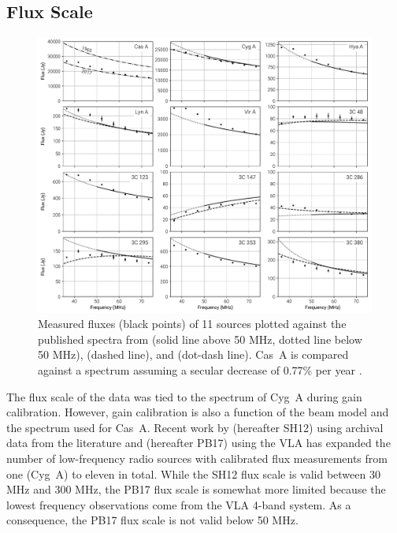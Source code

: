 \documentclass[twocolumn]{aastex61}
\begin{document}
\subsection{Flux Scale}

\begin{figure}[t]
    \includegraphics[width=\textwidth]{figures/flux-scale/flux-scale}
    \caption{
        Measured fluxes (black points) of 11 sources plotted against the published spectra from
        \citet{2017ApJS..230....7P} (solid line above 50 MHz, dotted line below 50 MHz),
        \citet{2012MNRAS.423L..30S} (dashed line), and \citet{1977A&A....61...99B} (dot-dash line).
        Cas~A is compared against a spectrum assuming a secular decrease of 0.77\% per year
        \citep{2009AJ....138..838H}.
    }
    \label{fig:flux-scale}
\end{figure}

The flux scale of the data was tied to the \citet{1977A&A....61...99B} spectrum of Cyg~A during gain
calibration. However, gain calibration is also a function of the beam model and the spectrum used
for Cas~A. Recent work by \citet{2012MNRAS.423L..30S} (hereafter SH12) using archival data from the
literature and \citet{2017ApJS..230....7P} (hereafter PB17) using the VLA has expanded the number of
low-frequency radio sources with calibrated flux measurements from one (Cyg~A) to eleven in total.
While the SH12 flux scale is valid between 30 MHz and 300 MHz, the PB17 flux scale is somewhat more
limited because the lowest frequency observations come from the VLA 4-band system. As a consequence,
the PB17 flux scale is not valid below 50 MHz.
\end{document}
